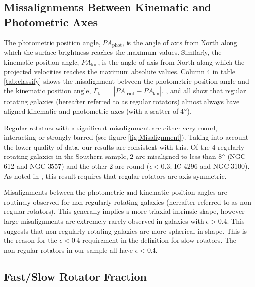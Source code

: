 		

		\subsection{Missalignments Between Kinematic and Photometric Axes}
			\label{subsec:Misalignment}
			The photometric position angle, $PA_\text{phot}$, is the angle of axis from North along which the surface brightness reaches the maximum values. Similarly, the kinematic position angle, $PA_\text{kin}$, is the angle of axis from North along which the projected velocities reaches the maximum absolute values. Column 4 in table \ref{tab:classify} shows the misalignment between the photometric position angle and the kinematic position angle, $\Gamma_\text{kin} = \left| PA_\text{phot} - PA_\text{kin} \right|$. \citet{Cappellari2007}, \citet{Krajnovic2011} and \citet{Fogarty2015} all show that regular rotating galaxies (hereafter referred to as regular rotators) almost always have aligned kinematic and photometric axes (with a scatter of 4$\degree$). 

			Regular rotators with a significant misalignment are either very round, interacting or strongly barred (see figure \ref{fig:Misalignment}). Taking into account the lower quality of data, our results are consistent with this. Of the 4 regularly rotating galaxies in the Southern sample, 2 are misaligned to less than 8$\degree$ (NGC 612 and NGC 3557) and the other 2 are round ($\epsilon < 0.3$; IC 4296 and NGC 3100). As noted in \citet{Cappellari2016}, this result requires that regular rotators are axis-symmetric.

		
			Misalignments between the photometric and kinematic position angles are routinely observed for non-regularly rotating galaxies (hereafter referred to as non regular-rotators). This generally implies a more triaxial intrinsic shape, however large misalignments are extremely rarely observed in galaxies with $\epsilon > 0.4$. This suggests that non-regularly rotating galaxies are more spherical in shape. This is the reason for the $\epsilon < 0.4$ requirement in the definition for slow rotators. The non-regular rotators in our sample all have $\epsilon < 0.4$. 
		
		


	\subsection{Fast/Slow Rotator Fraction}
		\label{subsec:FSfrac}
		


